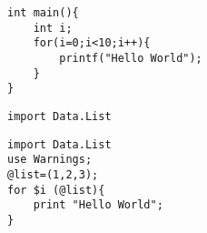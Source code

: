 \documentclass [a4paper,11pt] {article}
\begin{document}
\lstset{language=C}

\begin{lstlisting}
int main(){
	int i;
	for(i=0;i<10;i++){
		printf("Hello World");
	}
}
\end{lstlisting}

\lstset{language=Haskell,numbers=left}

\begin{lstlisting}
import Data.List

\end{lstlisting}

\lstset{language=Perl}

\begin{lstlisting}
import Data.List
use Warnings;
@list=(1,2,3);
for $i (@list){
	print "Hello World";
}
\end{lstlisting}
\end{document}
